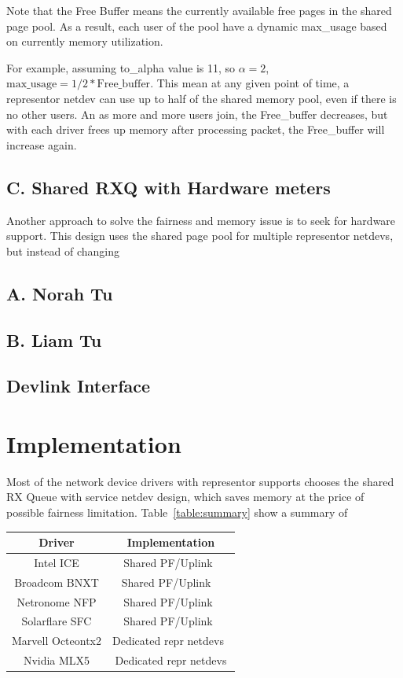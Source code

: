 \documentclass[letterpaper]{article}
\begin{document}
Note that the Free Buffer means the currently available free pages
in the shared page pool. As a result, each user of the pool have a
dynamic max\_usage based on currently memory utilization.

For example, assuming to\_alpha value is 11, so $\alpha = 2$, $ \text{max\_usage}
= 1/2 * \text{Free\_buffer} $.
This mean at any given point of time, a representor netdev can use up to half of
the shared memory pool, even if there is no other users. An as more and more
users join, the Free\_buffer decreases, but with each driver frees up memory
after processing packet, the Free\_buffer will increase again.

\subsection{C. Shared RXQ with Hardware meters}
Another approach to solve the fairness and memory issue is to seek for hardware
support. This design uses the shared page pool for multiple representor netdevs,
but instead of changing 

\subsection{A. Norah Tu}
\subsection{B. Liam Tu}
\subsection{Devlink Interface}

\section{Implementation}
Most of the network device drivers with representor supports chooses the shared
RX Queue with service netdev design, which saves memory at the price of possible
fairness limitation. Table~\ref{table:summary} show a summary of 

\begin{tabular}{|c|c|} \hline
     Driver &  Implementation\\ \hline \hline
     Intel ICE & Shared PF/Uplink~\cite{icepatch} \\ \hline
     Broadcom BNXT & Shared PF/Uplink ~\cite{survey} \\ \hline
     Netronome NFP & Shared PF/Uplink~\cite{survey} \\ \hline
     Solarflare SFC &  Shared PF/Uplink~\cite{survey} \\ \hline
     Marvell Octeontx2 & Dedicated repr netdevs~\cite{octeontx2} \\ \hline
     Nvidia MLX5 & Dedicated repr netdevs \\ \hline
\end{tabular}
\end{document}
